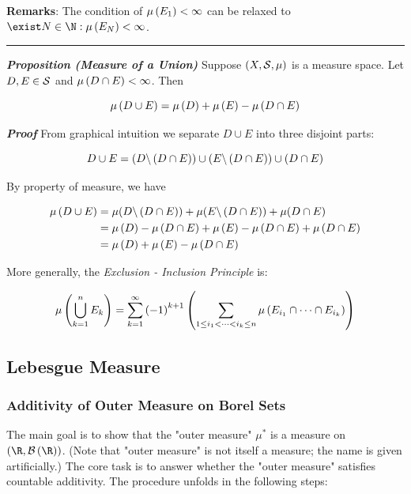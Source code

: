 \documentclass[
]{article}
\begin{document}
\textbf{Remarks}: The condition of \(\mu\pr{E_1}<\infty\) can be relaxed
to \(\exist N\in \N: \mu\pr{E_N}<\infty\).

\begin{center}\rule{0.5\linewidth}{0.5pt}\end{center}

\emph{\textbf{Proposition (Measure of a Union)}} Suppose
\(\pr{X,\S,\mu}\) is a measure space. Let \(D,E\in \S\) and
\(\mu\pr{D\cap E}<\infty\). Then

\[\mu\pr{D\cup E} = \mu \pr{D}+\mu\pr{E}-\mu\pr{D\cap E}\]

\emph{\textbf{Proof}} From graphical intuition we separate \(D\cup E\)
into three disjoint parts:

\[D\cup E = \pr{D\c \pr{D\cap E}}\cup \pr{E\c \pr{D\cap E}}\cup \pr{D\cap E}\]

By property of measure, we have

\[\ba
\mu\pr{D\cup E} & = \mu{\pr{D\c \pr{D\cap E}}}+\mu{\pr{E\c \pr{D\cap E}}}+\mu{\pr{D\cap E}}\\
& = \mu\pr{D}-\mu\pr{D\cap E}+\mu\pr{E}-\mu\pr{D\cap E}+\mu\pr{D\cap E}\\
& = \mu \pr{D}+\mu\pr{E}-\mu\pr{D\cap E}
\ea\]

More generally, the \emph{Exclusion - Inclusion Principle} is:

\[\mu\pr{\bigcup_{k = 1}^nE_k} = \sum_{k = 1}^{\infty}\pr{-1}^{k+1}\pr{\sum_{1\le i_1<\cdots < i_k\le n}\mu\pr{E_{i_1}\cap \cdots \cap E_{i_k}}}\]

\hypertarget{lebesgue-measure}{%
\subsection{Lebesgue Measure}\label{lebesgue-measure}}

\hypertarget{additivity-of-outer-measure-on-borel-sets}{%
\subsubsection{Additivity of Outer Measure on Borel
Sets}\label{additivity-of-outer-measure-on-borel-sets}}

The main goal is to show that the "outer measure" \(\mu^*\) is a measure
on \(\pr{\R,\B\pr{\R}}\). (Note that "outer measure" is not itself a
measure; the name is given artificially.) The core task is to answer
whether the "outer measure" satisfies countable additivity. The
procedure unfolds in the following steps:
\end{document}
